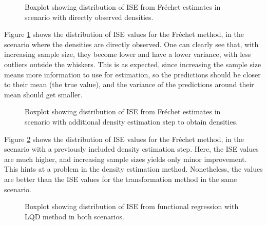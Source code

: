 \begin{figure}[h]
    \centering
    \resizebox{1\textwidth}{!}{}
    \caption[Simulation results: ISE boxplot --- Fréchet method with observed densities]{Boxplot showing distribution of
    ISE from Fréchet estimates in scenario with directly observed densities.}
    \label{fig:ise_frechet}
\end{figure}

Figure \ref{fig:ise_frechet} shows the distribution of ISE values for the Fréchet method,
in the scenario where the densities are directly observed. One can clearly see that, with
increasing sample size, they become lower and have a lower variance, with less outliers
outside the whiskers. This is as expected, since increasing the sample size
means more information to use for estimation, so the predictions should be closer to
their mean (the true value), and the variance of the predictions around their mean should
get smaller.

\begin{figure}[h]
    \centering
    \resizebox{1\textwidth}{!}{}
    \caption[Simulation results: ISE boxplot --- Fréchet method with estimated densities]{Boxplot
    showing distribution of ISE from Fréchet estimates in scenario with additional
    density estimation step to obtain densities.}
    \label{fig:ise_frechet_denstimation}
\end{figure}

Figure \ref{fig:ise_frechet_denstimation} shows the distribution of ISE values for
the Fréchet method, in the scenario with a previously included density estimation step.
Here, the ISE values are much higher, and increasing sample sizes yields only minor
improvement. This hints at a problem in the density estimation method. Nonetheless,
the values are better than the ISE values for the transformation method in the same
scenario.

\begin{figure}[h]
    \centering
    \resizebox{\textwidth}{!}{}
    \caption[Simulation results: ISE boxplot --- functional regression]{Boxplot showing
    distribution of ISE from functional regression with LQD method in both scenarios.}
    \label{fig:ise_func_reg_both}
\end{figure}

